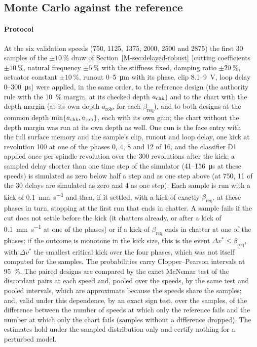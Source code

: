 \subsection{Monte Carlo against the reference}\label{supp:ba-mc}

\paragraph{Protocol} At the six validation speeds (750, 1125, 1375, 2000, 2500 and \SI{2875}{\rpm}) the first 30 samples of the $\pm\SI{10}{\percent}$ draw of Section~\ref{M-sec:delayed-robust} (cutting coefficients $\pm\SI{10}{\percent}$, natural frequency $\pm\SI{5}{\percent}$ with the stiffness fixed, damping ratio $\pm\SI{20}{\percent}$, actuator constant $\pm\SI{10}{\percent}$, runout 0--\SI{5}{\micro\metre} with its phase, clip 8.1--\SI{9}{\volt}, loop delay 0--\SI{300}{\micro\second}) were applied, in the same order, to the reference design (the authority rule with the \SI{10}{\percent} margin, at its checked depth $a_{\mathrm{chk}}$) and to the chart with the depth margin (at its own depth $a_{\mathrm{rob}}$, for each $\beta_{\mathrm{req}}$), and to both designs at the common depth $\min\{a_{\mathrm{chk}},a_{\mathrm{rob}}\}$, each with its own gain; the chart without the depth margin was run at its own depth as well. One run is the face entry with the full surface memory and the sample's clip, runout and loop delay, one kick at revolution 100 at one of the phases 0, 4, 8 and 12 of 16, and the classifier D1 applied once per spindle revolution over the 300 revolutions after the kick; a sampled delay shorter than one time step of the simulator (41--\SI{156}{\micro\second} at these speeds) is simulated as zero below half a step and as one step above (at \SI{750}{\rpm}, 11 of the 30 delays are simulated as zero and 4 as one step). Each sample is run with a kick of \SI{0.1}{\milli\metre\per\second} and then, if it settled, with a kick of exactly $\beta_{\mathrm{req}}$, at these phases in turn, stopping at the first run that ends in chatter. A sample fails if the cut does not settle before the kick (it chatters already, or after a kick of \SI{0.1}{\milli\metre\per\second} at one of the phases) or if a kick of $\beta_{\mathrm{req}}$ ends in chatter at one of the phases: if the outcome is monotone in the kick size, this is the event $\Delta v^*\le\beta_{\mathrm{req}}$, with $\Delta v^*$ the smallest critical kick over the four phases, which was not itself computed for the samples. The probabilities carry Clopper--Pearson intervals at \SI{95}{\percent}. The paired designs are compared by the exact McNemar test of the discordant pairs at each speed and, pooled over the speeds, by the same test and pooled intervals, which are approximate because the speeds share the samples; and, valid under this dependence, by an exact sign test, over the samples, of the difference between the number of speeds at which only the reference fails and the number at which only the chart fails (samples without a difference dropped). The estimates hold under the sampled distribution only and certify nothing for a perturbed model.
